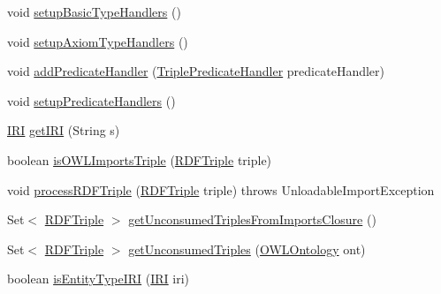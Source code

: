 \begin{DoxyCompactItemize}
void \hyperlink{classorg_1_1coode_1_1owlapi_1_1rdfxml_1_1parser_1_1_o_w_l_r_d_f_consumer_a8dcd2a9093dc36f45a1a95d36da2383a}{setup\-Basic\-Type\-Handlers} ()
\item 
void \hyperlink{classorg_1_1coode_1_1owlapi_1_1rdfxml_1_1parser_1_1_o_w_l_r_d_f_consumer_a0e37e5e53d1d3387568c88e2fd4cfa01}{setup\-Axiom\-Type\-Handlers} ()
\item 
void \hyperlink{classorg_1_1coode_1_1owlapi_1_1rdfxml_1_1parser_1_1_o_w_l_r_d_f_consumer_a24b003231c0eda389710610f1a4d8435}{add\-Predicate\-Handler} (\hyperlink{classorg_1_1coode_1_1owlapi_1_1rdfxml_1_1parser_1_1_triple_predicate_handler}{Triple\-Predicate\-Handler} predicate\-Handler)
\item 
void \hyperlink{classorg_1_1coode_1_1owlapi_1_1rdfxml_1_1parser_1_1_o_w_l_r_d_f_consumer_ad53f6a081be9abf3b0fc47e9a4ef5353}{setup\-Predicate\-Handlers} ()
\item 
\hyperlink{classorg_1_1semanticweb_1_1owlapi_1_1model_1_1_i_r_i}{I\-R\-I} \hyperlink{classorg_1_1coode_1_1owlapi_1_1rdfxml_1_1parser_1_1_o_w_l_r_d_f_consumer_af09a6c690b3021fb8eee5997495e0c47}{get\-I\-R\-I} (String s)
\item 
boolean \hyperlink{classorg_1_1coode_1_1owlapi_1_1rdfxml_1_1parser_1_1_o_w_l_r_d_f_consumer_a874820c21bde04e4e925cc024d61db39}{is\-O\-W\-L\-Imports\-Triple} (\hyperlink{classorg_1_1semanticweb_1_1owlapi_1_1io_1_1_r_d_f_triple}{R\-D\-F\-Triple} triple)
\item 
void \hyperlink{classorg_1_1coode_1_1owlapi_1_1rdfxml_1_1parser_1_1_o_w_l_r_d_f_consumer_ac2aed801698e5d00d4cb635b115373a6}{process\-R\-D\-F\-Triple} (\hyperlink{classorg_1_1semanticweb_1_1owlapi_1_1io_1_1_r_d_f_triple}{R\-D\-F\-Triple} triple)  throws Unloadable\-Import\-Exception 
\item 
Set$<$ \hyperlink{classorg_1_1semanticweb_1_1owlapi_1_1io_1_1_r_d_f_triple}{R\-D\-F\-Triple} $>$ \hyperlink{classorg_1_1coode_1_1owlapi_1_1rdfxml_1_1parser_1_1_o_w_l_r_d_f_consumer_a323a664087ac1d6d6c53746ca1ec8fb3}{get\-Unconsumed\-Triples\-From\-Imports\-Closure} ()
\item 
Set$<$ \hyperlink{classorg_1_1semanticweb_1_1owlapi_1_1io_1_1_r_d_f_triple}{R\-D\-F\-Triple} $>$ \hyperlink{classorg_1_1coode_1_1owlapi_1_1rdfxml_1_1parser_1_1_o_w_l_r_d_f_consumer_a5118393a299b88829ed436ba01fb15f7}{get\-Unconsumed\-Triples} (\hyperlink{interfaceorg_1_1semanticweb_1_1owlapi_1_1model_1_1_o_w_l_ontology}{O\-W\-L\-Ontology} ont)
\item 
boolean \hyperlink{classorg_1_1coode_1_1owlapi_1_1rdfxml_1_1parser_1_1_o_w_l_r_d_f_consumer_a1230fb46169b4dff00698ea4a0a93e05}{is\-Entity\-Type\-I\-R\-I} (\hyperlink{classorg_1_1semanticweb_1_1owlapi_1_1model_1_1_i_r_i}{I\-R\-I} iri)

\end{DoxyCompactItemize}
